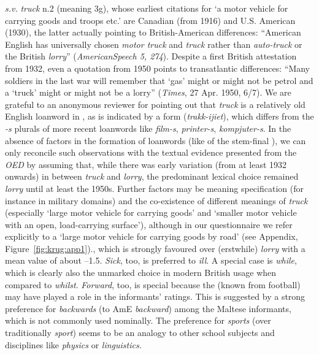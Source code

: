 \documentclass[output=paper]{langsci/langscibook}
\begin{document}
\begin{itemize}
{    \textit{s.v.}  \textit{truck} n.2 (meaning 3g), whose earliest
    citations for ‘a motor vehicle for carrying goods and troops etc.’
    are Canadian (from 1916) and U.S. American (1930), the latter
    actually pointing to British-American differences: “American
    English has universally chosen \emph{motor truck} and \emph{truck}
    rather than \emph{auto-truck} or the British \emph{lorry}”
    (\textit{AmericanSpeech 5, 274}). Despite a first British
    attestation from 1932, even a quotation from 1950 points to
    transatlantic differences: “Many soldiers in the last war will
    remember that ‘gas’ might or might not be petrol and a ‘truck’
    might or might not be a lorry” (\textit{Times}, 27 Apr. 1950,
    6/7). We are grateful to an anonymous reviewer for pointing out
    that \textit{truck} is a relatively old English loanword in
    , as is indicated by a   form (\textit{trakk-ijiet}),
    which differs from the \textit{-s} plurals of more recent loanwords like
    \textit{film-s}, \textit{printer-s}, \textit{kompjuter-s}. In the absence of 
    factors in the  formation of  loanwords (like
     of the stem-final ), we can only reconcile such
    observations with the textual evidence presented from the \textit{OED} by
    assuming that, while there was early variation (from at least 1932
    onwards) in  between \textit{truck} and \textit{lorry}, the
    predominant  lexical choice remained \textit{lorry} until at least the
    1950s. Further factors may be meaning specification (for instance
    in military domains) and the co-existence of different meanings of
    \textit{truck} (especially ‘large motor vehicle for carrying goods’ and
    ‘smaller motor vehicle with an open, load-carrying surface’),
    although in our questionnaire we refer explicitly to a ‘large
    motor vehicle for carrying goods by road’ (see Appendix, Figure~\ref{fig:krug:app1}).},
  which is strongly favoured over (erstwhile)  \textit{lorry} with
  a mean value of about --1.5. \textit{Sick}, too, is preferred to
  \textit{ill}. A special case is \textit{while}, which is clearly
  also the unmarked choice in modern British usage when compared to
  \textit{whilst}. \textit{Forward}, too, is special because the 
  (known from football) may have played a role in the informants’
  ratings. This is suggested by a strong preference for
  \textit{backwards} (to AmE \textit{backward}) among the Maltese
  informants, which is not commonly used nominally. The preference for
  \textit{sports} (over traditionally  \textit{sport}) seems to be
  an analogy to other school subjects and disciplines like
  \textit{physics} or \textit{linguistics.}
\end{itemize}
\end{document}
